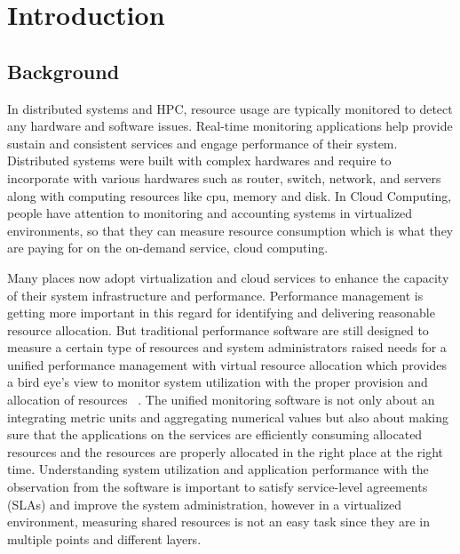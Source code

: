 \documentclass{sig-alternate}
\begin{document}
\section{Introduction} 

\subsection{Background}
In distributed systems and HPC, resource usage are typically monitored to detect any hardware and software issues. Real-time monitoring applications help provide sustain and consistent services and engage performance of their system. Distributed systems were built with complex hardwares and require to incorporate with various hardwares such as router, switch, network, and servers along with computing resources like cpu, memory and disk. In Cloud Computing, people have attention to monitoring and accounting systems in virtualized environments, so that they can measure resource consumption which is what they are paying for on the on-demand service, cloud computing. 

Many places now adopt virtualization and cloud services to enhance the capacity of their system infrastructure and performance. Performance management is getting more important in this regard for identifying and delivering reasonable resource allocation. But traditional performance software are still designed to measure a certain type of resources and system administrators raised needs for a unified performance management with virtual resource allocation which provides a bird eye's view to monitor system utilization with the proper provision and allocation of resources ~\cite{Habibzai12}. The unified monitoring software is not only about an integrating metric units and aggregating numerical values but also about making sure that the applications on the services are efficiently consuming allocated resources and the resources are properly allocated in the right place at the right time. Understanding system utilization and application performance with the observation from the software is important to satisfy service-level agreements (SLAs) and improve the system administration, however in a virtualized environment, measuring shared resources is not an easy task since they are in multiple points and different layers. 
\end{document}

